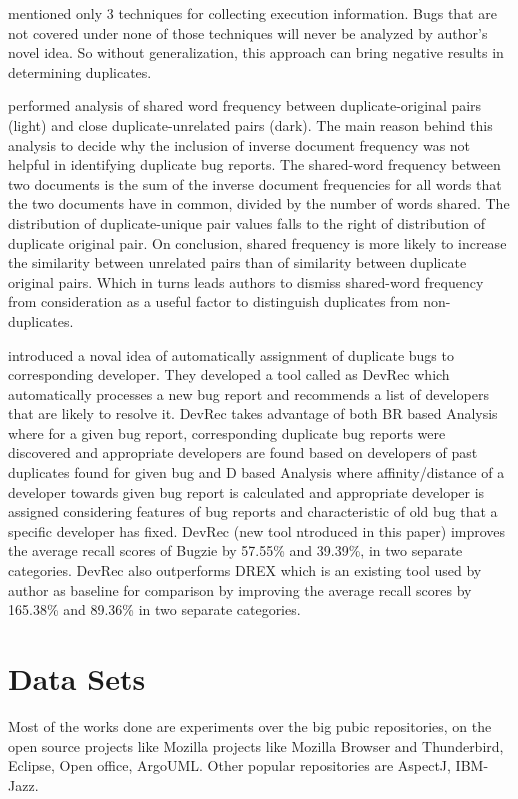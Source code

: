 \documentclass[]{sig-alternate-05-2015}
\begin{document}
\cite{Wang2008} mentioned only 3 techniques for collecting execution information. Bugs that are not covered under none of those techniques will never be analyzed by author’s novel idea. So without generalization, this approach can bring negative results in determining duplicates.

\cite{Jalbert2008} performed analysis of shared word frequency between duplicate-original pairs (light) and close duplicate-unrelated pairs (dark). The main reason behind this analysis to decide why the inclusion of inverse document frequency was not helpful in identifying duplicate bug reports. The shared-word frequency between two documents is the sum of the inverse document frequencies for all words that the two documents have in common, divided by the number of words shared. The distribution of duplicate-unique pair values falls to the right of distribution of duplicate original pair. On conclusion, shared frequency is more likely to increase the similarity between unrelated pairs than of similarity between duplicate original pairs. Which in turns leads authors to dismiss shared-word frequency from consideration as a useful factor to distinguish duplicates from non-duplicates.

\cite{Xia2015} introduced a noval idea of automatically assignment of duplicate bugs to corresponding developer. They developed a tool called as DevRec which automatically processes a new bug report and recommends a list of developers that are likely to resolve it. DevRec takes advantage of both BR based Analysis where for a given bug report, corresponding duplicate bug reports were discovered and appropriate developers are found based on developers of past duplicates found for given bug and D based Analysis where affinity/distance of a developer towards given bug report is calculated and appropriate developer is assigned considering features of bug reports and characteristic of old bug that a specific developer has fixed. DevRec (new tool ntroduced in this paper) improves the average recall scores of Bugzie by 57.55\% and 39.39\%, in two separate categories. DevRec also outperforms DREX which is an existing tool used by author as baseline for comparison by improving the average recall scores by 165.38\% and 89.36\% in two separate categories.

\section{Data Sets}

Most of the works done are experiments over the big pubic repositories, on the open source projects like Mozilla projects like Mozilla Browser and Thunderbird, Eclipse, Open office, ArgoUML. Other popular repositories are AspectJ, IBM-Jazz. \newline
\end{document}
